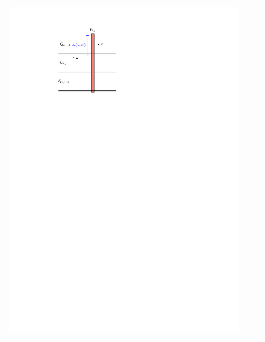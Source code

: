 \documentclass{patmorin}
\begin{document}
\begin{figure}
    \centering
    \begin{tabular}{ccc}
    \includegraphics[page=1,scale=0.85]{figs/new_metric} &

\end{tabular}
\end{figure}
\end{document}
